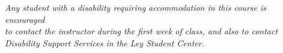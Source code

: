 \documentclass[11pt]{article}
\begin{document}
\vspace{2em}
\begin{center}
\em Any student with a disability requiring accommodation in this course is encouraged\\
to contact the instructor during the first week of class, and also to contact\\
Disability Support Services in the Ley Student Center.
\end{center}

%
%
\end{document}

